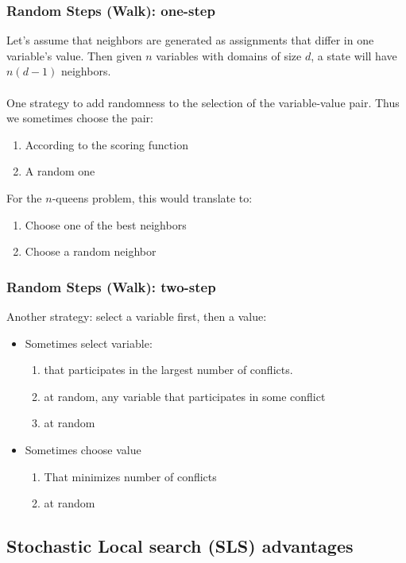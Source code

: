 \documentclass{article}
\begin{document}
\subsubsection*{Random Steps (Walk): one-step}
Let’s assume that neighbors are generated as assignments that differ in one variable's value. Then given $ n $ variables with domains of size $ d $, a state will have $ n(d-1) $ neighbors. \\ \\
One strategy to add randomness to the selection of the variable-value pair. Thus we sometimes  choose the pair:
\begin{enumerate}
	\item According to the scoring function 
	\item A random one
\end{enumerate}
For the $ n $-queens problem, this would translate to:
\begin{enumerate}
	\item Choose one of the best neighbors 
	\item Choose a random neighbor
\end{enumerate}
\subsubsection*{Random Steps (Walk): two-step}
Another strategy: select a variable first, then a value:
\begin{itemize}
	\item Sometimes select variable:
	\begin{enumerate}
		\item that participates in the largest number of conflicts.
	\item at random, any variable that participates in some conflict
	\item at random
	\end{enumerate}
	\item Sometimes choose value
	\begin{enumerate}[label = \alph*)]
		\item That minimizes number of conflicts 
		\item at random
	\end{enumerate}
\end{itemize}

\subsection*{Stochastic Local search (SLS) advantages}
\end{document}
